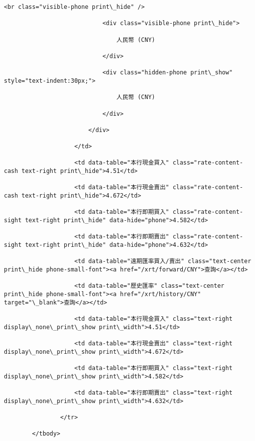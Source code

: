 \documentclass[11pt]{article}
\begin{document}
\begin{Verbatim}[commandchars=\\\{\}]
                            <br class="visible-phone print\_hide" />

                            <div class="visible-phone print\_hide">

                                人民幣 (CNY)

                            </div>

                            <div class="hidden-phone print\_show" style="text-indent:30px;">

                                人民幣 (CNY)

                            </div>

                        </div>

                    </td>

                    <td data-table="本行現金買入" class="rate-content-cash text-right print\_hide">4.51</td>

                    <td data-table="本行現金賣出" class="rate-content-cash text-right print\_hide">4.672</td>

                    <td data-table="本行即期買入" class="rate-content-sight text-right print\_hide" data-hide="phone">4.582</td>

                    <td data-table="本行即期賣出" class="rate-content-sight text-right print\_hide" data-hide="phone">4.632</td>

                    <td data-table="遠期匯率買入/賣出" class="text-center print\_hide phone-small-font"><a href="/xrt/forward/CNY">查詢</a></td>

                    <td data-table="歷史匯率" class="text-center print\_hide phone-small-font"><a href="/xrt/history/CNY" target="\_blank">查詢</a></td>

                    <td data-table="本行現金買入" class="text-right display\_none\_print\_show print\_width">4.51</td>

                    <td data-table="本行現金賣出" class="text-right display\_none\_print\_show print\_width">4.672</td>

                    <td data-table="本行即期買入" class="text-right display\_none\_print\_show print\_width">4.582</td>

                    <td data-table="本行即期賣出" class="text-right display\_none\_print\_show print\_width">4.632</td>

                </tr>

        </tbody>


\end{Verbatim}
\end{document}
